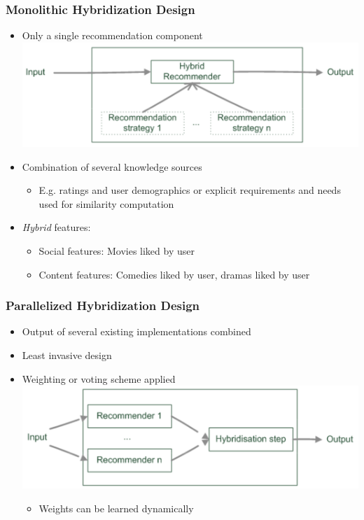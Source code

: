 \documentclass{beamer}
\begin{document}
\begin{frame}
    \frametitle{Monolithic Hybridization Design}
    \begin{itemize}
    \item Only a single recommendation component\\
        \includegraphics[width=\linewidth]{mono}
    \item Combination of several knowledge sources
        \begin{itemize}
        \item E.g. ratings and user demographics or explicit requirements and
            needs used for similarity computation
        \end{itemize}
    \item \emph{Hybrid} features:
        \begin{itemize}
        \item Social features: Movies liked by user
        \item Content features: Comedies liked by user, dramas liked by user
        \end{itemize}
    \end{itemize}
\end{frame}

\begin{frame}
    \frametitle{Parallelized Hybridization Design}
    \begin{itemize}
    \item Output of several existing implementations combined
    \item Least invasive design
    \item Weighting or voting scheme applied\\
        \includegraphics[width=\linewidth]{paralel}
        \begin{itemize}
        \item Weights can be learned dynamically
        \end{itemize}
    \end{itemize}
\end{frame}
\end{document}
